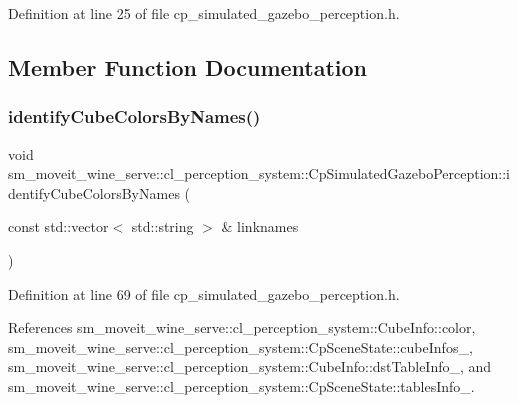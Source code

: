 Definition at line 25 of file cp\+\_\+simulated\+\_\+gazebo\+\_\+perception.\+h.



\subsection{Member Function Documentation}
\mbox{\label{classsm__moveit__wine__serve_1_1cl__perception__system_1_1CpSimulatedGazeboPerception_a0a6d37ab728b459d96322cb4ef734f2a}} 
\subsubsection{\texorpdfstring{identify\+Cube\+Colors\+By\+Names()}{identifyCubeColorsByNames()}}
{\footnotesize\ttfamily void sm\+\_\+moveit\+\_\+wine\+\_\+serve\+::cl\+\_\+perception\+\_\+system\+::\+Cp\+Simulated\+Gazebo\+Perception\+::identify\+Cube\+Colors\+By\+Names (\begin{DoxyParamCaption}\item[{const std\+::vector$<$ std\+::string $>$ \&}]{linknames }\end{DoxyParamCaption})\hspace{0.3cm}{\ttfamily [inline]}}



Definition at line 69 of file cp\+\_\+simulated\+\_\+gazebo\+\_\+perception.\+h.



References sm\+\_\+moveit\+\_\+wine\+\_\+serve\+::cl\+\_\+perception\+\_\+system\+::\+Cube\+Info\+::color, sm\+\_\+moveit\+\_\+wine\+\_\+serve\+::cl\+\_\+perception\+\_\+system\+::\+Cp\+Scene\+State\+::cube\+Infos\+\_\+, sm\+\_\+moveit\+\_\+wine\+\_\+serve\+::cl\+\_\+perception\+\_\+system\+::\+Cube\+Info\+::dst\+Table\+Info\+\_\+, and sm\+\_\+moveit\+\_\+wine\+\_\+serve\+::cl\+\_\+perception\+\_\+system\+::\+Cp\+Scene\+State\+::tables\+Info\+\_\+.


